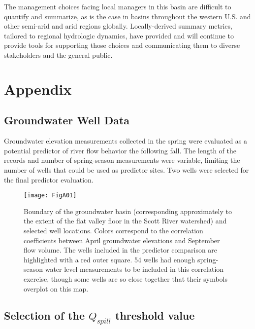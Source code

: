 \documentclass[hess, manuscript]{copernicus}
\begin{document}
The management choices facing local managers in this basin are difficult
to quantify and summarize, as is the case in basins throughout the
western U.S. and other semi-arid and arid regions globally.
Locally-derived summary metrics, tailored to regional hydrologic
dynamics, have provided and will continue to provide tools for
supporting those choices and communicating them to diverse stakeholders
and the general public.

\newpage

\section{Appendix}

\appendixfigures
\appendixtables

\subsection{Groundwater Well Data}

Groundwater elevation measurements collected in the spring were
evaluated as a potential predictor of river flow behavior the following
fall. The length of the records and number of spring-season measurements
were variable, limiting the number of wells that could be used as
predictor sites. Two wells were selected for the final predictor
evaluation.

\begin{figure}
\texttt{[image: FigA01]} \caption{\label{fig:gw_vs_fall_flows_corr_map} Boundary of the groundwater basin (corresponding approximately to the extent of the flat valley floor in the Scott River watershed) and selected well locations. Colors correspond to the correlation coefficients between April groundwater elevations and September flow volume. The wells included in the predictor comparison are highlighted with a red outer square. 54 wells had enough spring-season water level measurements to be included in this correlation exercise, though some wells are so close together that their symbols overplot on this map.}\label{fig:gw_vs_fall_flows_corr_map}
\end{figure}

\newpage

\subsection{\texorpdfstring{Selection of the $Q_{spill}$ threshold
value}{Selection of the Q\_\{spill\} threshold value}}
\end{document}
